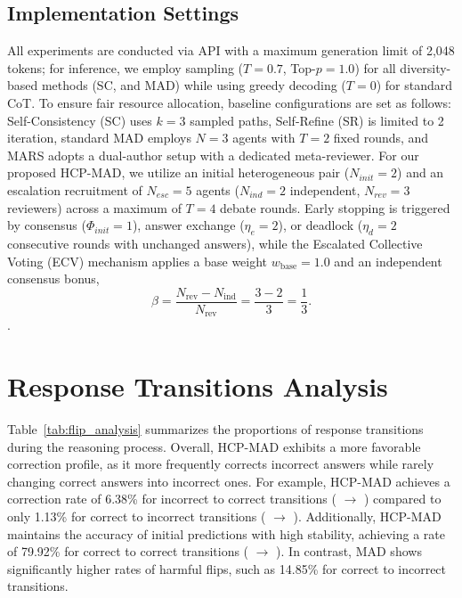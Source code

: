 \documentclass[11pt]{article}
\newcommand{\cmark}{\ding{51}}
\newcommand{\xmark}{\ding{55}}
\begin{document}
\subsection{Implementation Settings}
\label{sec:appendix_imp}
All experiments are conducted via API with a maximum generation limit of 2,048 tokens; for inference, we employ sampling ($T=0.7$, Top-$p=1.0$) for all diversity-based methods (SC, and MAD) while using greedy decoding ($T=0$) for standard CoT. To ensure fair resource allocation, baseline configurations are set as follows: Self-Consistency (SC) uses $k=3$ sampled paths, Self-Refine (SR) is limited to 2 iteration, standard MAD employs $N=3$ agents with $T=2$ fixed rounds, and MARS adopts a dual-author setup with a dedicated meta-reviewer. For our proposed HCP-MAD, we utilize an initial heterogeneous pair ($N_{init}=2$) and an escalation recruitment of $N_{esc}=5$ agents ($N_{ind}=2$ independent, $N_{rev}=3$ reviewers) across a maximum of $T=4$ debate rounds. Early stopping is triggered by consensus ($\Phi_{init}=1$), answer exchange ($\eta_e=2$), or deadlock ($\eta_d=2$ consecutive rounds with unchanged answers), while the Escalated Collective Voting (ECV) mechanism applies a base weight $w_{\text{base}} = 1.0$ and an independent consensus bonus, \[
\beta = \frac{N_{\text{rev}} - N_{\text{ind}}}{N_{\text{rev}}}
      = \frac{3 - 2}{3}
      = \frac{1}{3}.
\].

\section{Response Transitions Analysis} 
Table~\ref{tab:flip_analysis} summarizes the proportions of response transitions during the reasoning process. 
Overall, HCP-MAD exhibits a more favorable correction profile, as it more frequently corrects incorrect answers while rarely changing correct answers into incorrect ones. 
For example, HCP-MAD achieves a correction rate of 6.38\% for incorrect to correct transitions ( \textcolor{red}\xmark{} $\to$ \textcolor{green!60!black} \cmark ) compared to only 1.13\% for correct to incorrect transitions ( \textcolor{green!60!black} \cmark{} $\to$ \textcolor{red}\xmark ). 
Additionally, HCP-MAD maintains the accuracy of initial predictions with high stability, achieving a rate of 79.92\% for correct to correct transitions ( \textcolor{green!60!black} \cmark{} $\to$ \textcolor{green!60!black} \cmark ). 
In contrast, MAD shows significantly higher rates of harmful flips, such as 14.85\% for correct to incorrect transitions.%
\end{document}
